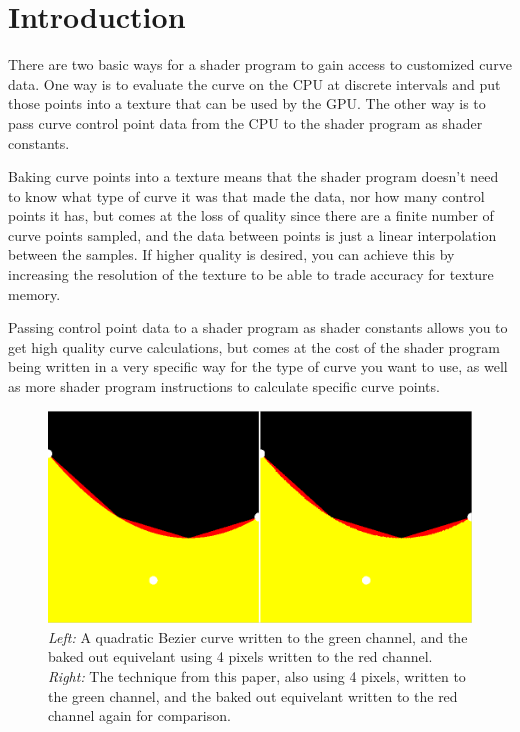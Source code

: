 \documentclass{jcgt}
\begin{document}
\section{Introduction}
\label{sec:introduction}
There are two basic ways for a shader program to gain access to customized curve data.  One way is to evaluate the curve on the CPU at discrete intervals and put those points into a texture that can be used by the GPU.  The other way is to pass curve control point data from the CPU to the shader program as shader constants.

Baking curve points into a texture means that the shader program doesn't need to know what type of curve it was that made the data, nor how many control points it has, but comes at the loss of quality since there are a finite number of curve points sampled, and the data between points is just a linear interpolation between the samples.  If higher quality is desired, you can achieve this by increasing the resolution of the texture to be able to trade accuracy for texture memory.

Passing control point data to a shader program as shader constants allows you to get high quality curve calculations, but comes at the cost of the shader program being written in a very specific way for the type of curve you want to use, as well as more shader program instructions to calculate specific curve points.

\begin{figure}
  \includegraphics[width=5in]{Figure2.png}
  \caption{\textit{Left:} A quadratic Bezier curve written to the green channel, and the baked out equivelant using 4 pixels written to the red channel.  \textit{Right:} The technique from this paper, also using 4 pixels, written to the green channel, and the baked out equivelant written to the red channel again for comparison. \label{fig:sampleconfig}}
  \label{fig:quickcomparison}
\end{figure}
\end{document}
